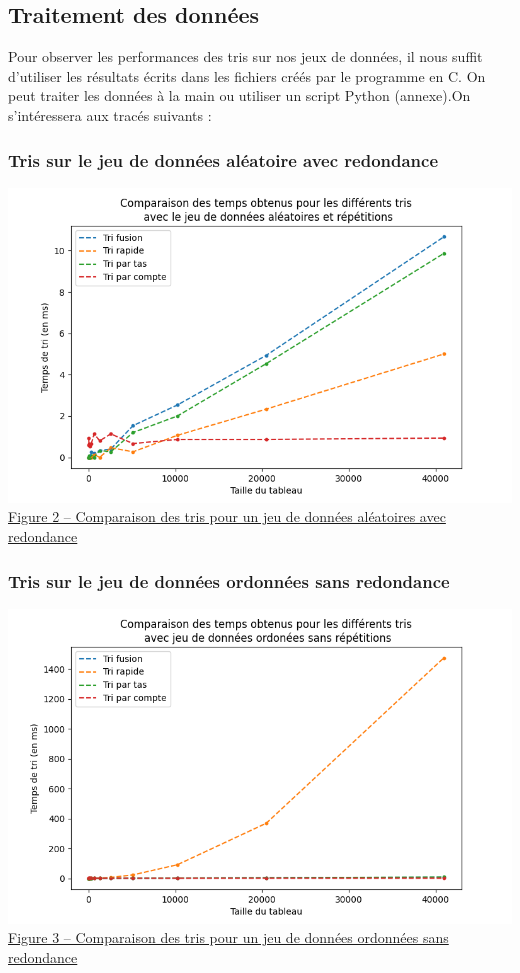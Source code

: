 \documentclass[11pt,a4paper]{article}
\begin{document}
\newpage

\subsection{Traitement des données}
Pour observer les performances des tris sur nos jeux de données, il nous suffit d’utiliser les
résultats écrits dans les fichiers créés par le programme en C. On peut traiter les données à la main
ou utiliser un script Python (annexe).On s’intéressera aux tracés suivants :

\subsubsection{Tris sur le jeu de données aléatoire avec redondance}
\includegraphics[scale = 0.5]{Images/Courbes img/aléatoire avec rep/aléatoires avec répétitions.png}\\
\underline {Figure 2 – Comparaison des tris pour un jeu de données aléatoires avec redondance}

\subsubsection{Tris sur le jeu de données ordonnées sans redondance}
\includegraphics[scale = 0.5]{Images/Courbes img/trié sans rep/ordonnées sans répétitions.png}\\
\underline {Figure 3 – Comparaison des tris pour un jeu de données ordonnées sans redondance}
\end{document}
